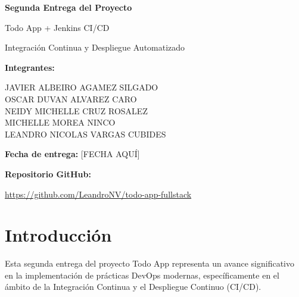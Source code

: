 \documentclass[12pt,a4paper]{article}
\begin{document}
\begin{titlepage}
    \centering
    \vspace{2cm}
    
    {\Huge\bfseries Segunda Entrega del Proyecto\par}
    \vspace{1cm}
    {\LARGE Todo App + Jenkins CI/CD\par}
    \vspace{0.5cm}
    {\large Integración Continua y Despliegue Automatizado\par}
    
    \vspace{3cm}
    
    {\Large\textbf{Integrantes:}\par}
    \vspace{0.5cm}
    {\large
        JAVIER ALBEIRO AGAMEZ SILGADO\\[0.3cm]
        OSCAR DUVAN ALVAREZ CARO\\[0.3cm]
        NEIDY MICHELLE CRUZ ROSALEZ\\[0.3cm]
        MICHELLE MOREA NINCO\\[0.3cm]
        LEANDRO NICOLAS VARGAS CUBIDES\\[0.3cm]
    }
    
    \vfill
    
    {\large\textbf{Fecha de entrega:} [FECHA AQUÍ]\par}
    \vspace{0.5cm}
    {\large\textbf{Repositorio GitHub:}\par}
    \vspace{0.3cm}
    {\small\url{https://github.com/LeandroNV/todo-app-fullstack}\par}
    
    \vspace{1cm}
\end{titlepage}

\tableofcontents
\newpage

\section{Introducción}

Esta segunda entrega del proyecto Todo App representa un avance significativo en la implementación de prácticas DevOps modernas, específicamente en el ámbito de la Integración Continua y el Despliegue Continuo (CI/CD).
\end{document}
